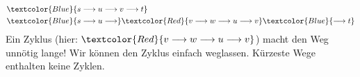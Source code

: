 \begin{myexercise}
\begin{myanswer}
\begin{figure}[H]
		\end{figure}
		\begin{align*}
			 & \textcolor{Blue}{s \longrightarrow u \longrightarrow v \longrightarrow t}                                                                                            \\
			 & \textcolor{Blue}{s \longrightarrow u \longrightarrow} \textcolor{Red}{ v \longrightarrow w \longrightarrow u \longrightarrow v} \textcolor{Blue}{\longrightarrow  t} \\
		\end{align*}
		Ein Zyklus (hier: $\textcolor{Red}{ v \longrightarrow w \longrightarrow u \longrightarrow v}$) macht den Weg unnötig lange! Wir können den Zyklus einfach weglassen. Kürzeste Wege enthalten keine Zyklen.
	\end{myanswer}
\end{myexercise}



\clearpage

